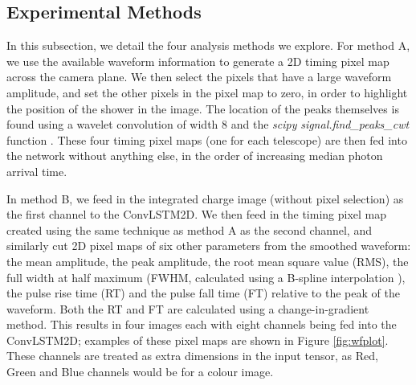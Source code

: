 \subsection{Experimental Methods}
In this subsection, we detail the four analysis methods we explore. For method A, we use the available waveform information to generate a 2D timing pixel map across the camera plane. We then select the pixels that have a large waveform amplitude, and set the other pixels in the pixel map to zero, in order to highlight the position of the shower in the image. The location of the peaks themselves is found using a wavelet convolution of width 8 and the \textit{scipy} \textit{signal.find\_peaks\_cwt} function \cite{scipy} \cite{findpeaks}. These four timing pixel maps (one for each telescope) are then fed into the network without anything else, in the order of increasing median photon arrival time.

In method B, we feed in the integrated charge image (without pixel selection) as the first channel to the ConvLSTM2D. We then feed in the timing pixel map created using the same technique as method A as the second channel, and similarly cut 2D pixel maps of six other parameters from the smoothed waveform: the mean amplitude, the peak amplitude, the root mean square value (RMS), the full width at half maximum (FWHM, calculated using a B-spline interpolation \cite{scipy}), the pulse rise time (RT) and the pulse fall time (FT) relative to the peak of the waveform. Both the RT and FT are calculated using a change-in-gradient method. This results in four images each with eight channels being fed into the ConvLSTM2D; examples of these pixel maps are shown in Figure \ref{fig:wfplot}. These channels are treated as extra dimensions in the input tensor, as Red, Green and Blue channels would be for a colour image.

